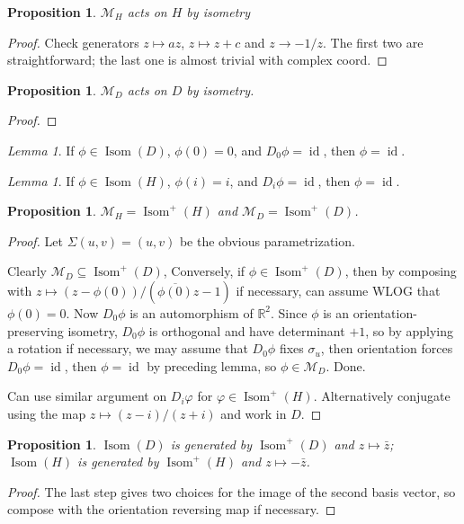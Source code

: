 \documentclass{article}
\theoremstyle{definition}
\theoremstyle{remark}
\newtheorem{lem}[defn]{Lemma}
\theoremstyle{plain}
\newtheorem{prop}[defn]{Proposition}
\theoremstyle{definition}
\newcommand{\RR}{\mathbb{R}}
\begin{document}
\begin{prop}
    $\mathcal{M}_H$ acts on $H$ by isometry
\end{prop}
\begin{proof}
    Check generators $z\mapsto az$, $z\mapsto z+c$ and $z\to-1/z$. The first two are straightforward; the last one is almost trivial with complex coord.
\end{proof}
\begin{prop}
    $\mathcal{M}_D$ acts on $D$ by isometry.
\end{prop}
\begin{proof}
    
\end{proof}
\begin{lem}
    If $\phi\in\operatorname{Isom}(D)$, $\phi(0)=0$, and  $D_0\phi=\operatorname{id}$, then $\phi=\operatorname{id}$.
\end{lem}
\begin{lem}
    If $\phi\in\operatorname{Isom}(H)$, $\phi(i)=i$, and $D_i\phi=\operatorname{id}$, then $\phi=\operatorname{id}$.
\end{lem}
\begin{prop}
    $\mathcal{M}_H=\operatorname{Isom}^+(H)$ and $\mathcal{M}_D=\operatorname{Isom}^+(D)$.
\end{prop}
\begin{proof}
    Let $\Sigma(u,v)=(u,v)$ be the obvious parametrization.
    
    Clearly $\mathcal{M}_D\subseteq\operatorname{Isom}^+(D)$, Conversely, if $\phi\in\operatorname{Isom}^+(D)$, then by composing with $z\mapsto (z-\phi(0))/(\overline{\phi(0)}z-1)$ if necessary, can assume WLOG that $\phi(0)=0$. Now $D_0\phi$ is an automorphism of $\RR^2$. Since $\phi$ is an orientation-preserving isometry, $D_0\phi$ is orthogonal and have determinant $+1$, so by applying a rotation if necessary, we may assume that $D_0\phi$ fixes $\sigma_u$, then orientation forces $D_0\phi=\operatorname{id}$, then $\phi=\operatorname{id}$ by preceding lemma, so $\phi\in\mathcal{M}_D$. Done.

    Can use similar argument on $D_i\varphi$ for $\varphi\in\operatorname{Isom}^+(H)$. Alternatively conjugate using the map $z\mapsto (z-i)/(z+i)$ and work in $D$.
\end{proof}
\begin{prop}
    $\operatorname{Isom}(D)$ is generated by $\operatorname{Isom}^+(D)$ and $z\mapsto\bar z$; $\operatorname{Isom}(H)$ is generated by $\operatorname{Isom}^+(H)$ and $z\mapsto-\bar z$.
\end{prop}
\begin{proof}
    The last step gives two choices for the image of the second basis vector, so compose with the orientation reversing map if necessary.
\end{proof}
\end{document}
